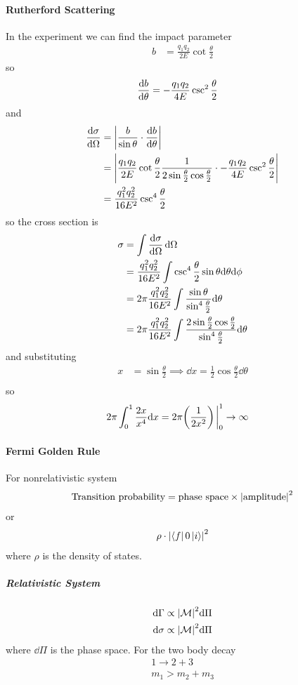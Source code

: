 \documentclass[../main.tex]{subfiles}
\begin{document}
\paragraph*{Rutherford Scattering} In the experiment we can find the impact parameter
\begin{align*}
    b &= \frac{q_1 q_2}{2E} \cot\frac{\theta}{2}
\end{align*}
so
\begin{align*}
    \dv{b}{\theta} &= -\frac{q_1 q_2}{4E} \csc^2\frac{\theta}{2}
\end{align*}
and
\begin{align*}
    \dv{\sigma}{\Omega} &= \abs{\frac{b}{\sin\theta} \cdot \dv{b}{\theta}} \\
    &= \abs{\frac{q_1 q_2}{2E} \cot\frac{\theta}{2} \frac{1}{2\sin\frac{\theta}{2} \cos\frac{\theta}{2}} 
    \cdot -\frac{q_1 q_2}{4E} \csc^2\frac{\theta}{2}} \\
    &= \frac{q_1^2 q_2^2}{16E^2} \csc^4\frac{\theta}{2}
\end{align*}
so the cross section is
\begin{align*}
    \sigma &= \int \dv{\sigma}{\Omega} \dd{\Omega} \\
    &= \frac{q_1^2 q_2^2}{16E^2} \int \csc^4\frac{\theta}{2} \sin\theta \dd \theta \dd \phi \\
    &= 2\pi \frac{q_1^2 q_2^2}{16E^2} \int \frac{\sin\theta}{\sin^4\frac{\theta}{2}} \dd \theta \\
    &= 2\pi \frac{q_1^2 q_2^2}{16E^2} \int \frac{2\sin\frac{\theta}{2}\cos\frac{\theta}{2}}{\sin^4\frac{\theta}{2}} \dd \theta
\end{align*}
and substituting
\begin{align*}
    x &= \sin\frac{\theta}{2} \implies \dd x = \frac{1}{2} \cos\frac{\theta}{2} \dd \theta \\
\end{align*}
so
\begin{align*}
    2\pi \int_0^1 \frac{2x}{x^4} \dd x &= 2\pi \qt(\frac{1}{2x^2})\eval_0^1 \to \infty
\end{align*}
\paragraph*{Fermi Golden Rule} For nonrelativistic system
\begin{align*}
    \text{Transition probability} = \text{phase space} \times \abs{\text{amplitude}}^2
\end{align*}
or
\begin{align*}
    \rho \cdot \abs{\bra f 0 \ket i}^2
\end{align*}
where $\rho $ is the density of states.
\subparagraph*{Relativistic System} 
\begin{align*}
    \dd \Gamma \propto \abs{\mathcal M}^2 \dd \Pi \\
    \dd \sigma \propto \abs{\mathcal M}^2 \dd \Pi
\end{align*} 
where $\dd \Pi$ is the phase space. For the two body decay
\begin{align*}
    1 \to 2 + 3 \\
    m_1 > m_2 + m_3
\end{align*}
\end{document}
